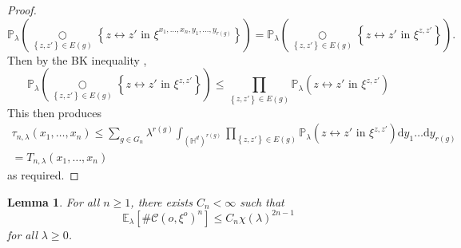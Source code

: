 \documentclass[10pt,a4paper,dvipsnames]{article}
\newtheorem{lemma}[theorem]{Lemma}
\theoremstyle{definition}
\theoremstyle{remark}
\newcommand{\pla}{\mathbb P_\lambda}
\newcommand{\ela}{\mathbb E_{\lambda}}
\newcommand{\HypDim}{{\mathbb{H}^d}}
\newcommand{\dd}{\mathrm{d}} %
\newcommand{\C}{\mathscr {C}}
\newcommand{\conn}[3]{#1 \longleftrightarrow #2\textrm { in } #3}
\newcommand{\orig}{o}
\numberwithin{equation}{section}
\begin{document}
\begin{proof}
\begin{equation}
    \pla\left(\underset{\left\{z,z'\right\}\in E(g)}{\bigcirc}\left\{\conn{z}{z'}{\xi^{x_1,\ldots,x_n,y_1,\ldots,y_{r(g)}}}\right\}\right)
    =  \pla\left(\underset{\left\{z,z'\right\}\in E(g)}{\bigcirc}\left\{\conn{z}{z'}{\xi^{z,z'}}\right\}\right).
\end{equation}
Then by the BK inequality \cite[Thm.\ 2.1]{HeyHofLasMat19},
\begin{equation}
    \pla\left(\underset{\left\{z,z'\right\}\in E(g)}{\bigcirc}\left\{\conn{z}{z'}{\xi^{z,z'}}\right\}\right) \leq \prod_{\left\{z,z'\right\}\in E(g)}\pla\left(\conn{z}{z'}{\xi^{z,z'}}\right)
\end{equation}
This then produces
\begin{multline}
    \tau_{n,\lambda}\left(x_1,\ldots,x_n\right)  \leq \sum_{g\in G_n}\lambda^{r(g)}\int_{\left(\HypDim\right)^{r(g)}} \prod_{\left\{z,z'\right\}\in E(g)}\pla\left(\conn{z}{z'}{\xi^{z,z'}}\right) \dd y_1\ldots \dd y_{r(g)}\\
     = T_{n,\lambda}\left(x_1,\ldots,x_n\right)\label{eqn:TreeGraphInequality}
\end{multline}
as required.
\end{proof}

\begin{lemma}
\label{lem:nclusterUpper}
    For all $n\geq 1$, there exists $C_n <\infty$ such that
    \begin{equation}
        \ela\left[\#\C\left(\orig,\xi^{\orig}\right)^n\right] \leq C_n \chi\left(\lambda\right)^{2n-1}
    \end{equation}
    for all $\lambda\geq0$.
\end{lemma}
\end{document}
